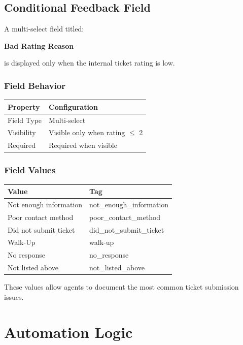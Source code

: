 \documentclass[11pt]{article}
\begin{document}
\subsection{Conditional Feedback Field}

A multi-select field titled:

\textbf{Bad Rating Reason}

is displayed only when the internal ticket rating is low.

\subsubsection{Field Behavior}

\begin{center}
\begin{tabular}{ll}
\toprule
Property & Configuration \\
\midrule
Field Type & Multi-select \\
Visibility & Visible only when rating $\leq$ 2 \\
Required & Required when visible \\
\bottomrule
\end{tabular}
\end{center}

\subsubsection{Field Values}

\begin{center}
\begin{tabular}{ll}
\toprule
Value & Tag \\
\midrule
Not enough information & not\_enough\_information \\
Poor contact method & poor\_contact\_method \\
Did not submit ticket & did\_not\_submit\_ticket \\
Walk-Up & walk-up \\
No response & no\_response \\
Not listed above & not\_listed\_above \\
\bottomrule
\end{tabular}
\end{center}

These values allow agents to document the most common ticket submission issues.

\section{Automation Logic}
\end{document}
